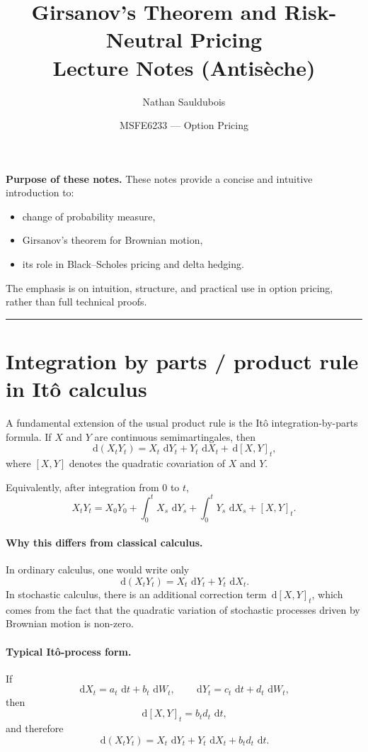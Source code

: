 \documentclass[11pt]{article}
\title{\textbf{Girsanov's Theorem and Risk-Neutral Pricing}\\
\large Lecture Notes (Antisèche)}
\author{Nathan Sauldubois}
\date{MSFE6233 --- Option Pricing}
\newcommand{\dd}{\,\mathrm{d}}
\newcommand{\1}{\mathbf{1}}
\begin{document}
\maketitle
\vspace{-1.2em}

\noindent\textbf{Purpose of these notes.}
These notes provide a concise and intuitive introduction to:
\begin{itemize}[leftmargin=1.4em, itemsep=0.2em]
  \item change of probability measure,
  \item Girsanov’s theorem for Brownian motion,
  \item its role in Black--Scholes pricing and delta hedging.
\end{itemize}

The emphasis is on intuition, structure, and practical use in option pricing,
rather than full technical proofs.

\vspace{0.5em}
\hrule
\vspace{1em}

\section*{Integration by parts / product rule in It\^o calculus}

A fundamental extension of the usual product rule is the It\^o integration-by-parts formula.
If \(X\) and \(Y\) are continuous semimartingales, then
$$
\dd(X_tY_t)=X_t\,\dd Y_t+Y_t\,\dd X_t+\dd[X,Y]_t,
$$
where \([X,Y]\) denotes the quadratic covariation of \(X\) and \(Y\).

Equivalently, after integration from \(0\) to \(t\),
$$
X_tY_t=X_0Y_0+\int_0^t X_s\,\dd Y_s+\int_0^t Y_s\,\dd X_s+[X,Y]_t.
$$

\paragraph{Why this differs from classical calculus.}
In ordinary calculus, one would write only
$$
\dd(X_tY_t)=X_t\,\dd Y_t+Y_t\,\dd X_t.
$$
In stochastic calculus, there is an additional correction term \(\dd[X,Y]_t\),
which comes from the fact that the quadratic variation of stochastic processes driven by Brownian motion is non-zero.

\paragraph{Typical It\^o-process form.}
If
$$
\dd X_t=a_t\,\dd t+b_t\,\dd W_t,
\qquad
\dd Y_t=c_t\,\dd t+d_t\,\dd W_t,
$$
then
$$
\dd[X,Y]_t=b_t d_t\,\dd t,
$$
and therefore
$$
\dd(X_tY_t)
=
X_t\,\dd Y_t+Y_t\,\dd X_t+b_t d_t\,\dd t.
$$
\end{document}
